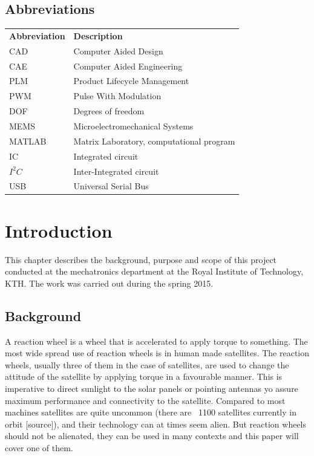 \documentclass[a4paper,11pt]{kth-mag}
\begin{document}
\section*{Abbreviations}
\noindent{}\begin{tabular}{@{}p{2.5cm}l}
\textbf{Abbreviation} 	& \textbf{Description} \vspace{.5em} \\
CAD			& Computer Aided Design \\
CAE			& Computer Aided Engineering\\
PLM			& Product Lifecycle Management\\
PWM			& Pulse With Modulation\\
DOF			& Degrees of freedom\\
MEMS			& Microelectromechanical Systems \\
MATLAB		& Matrix Laboratory, computational program\\
IC			& Integrated circuit\\
$I^2C$		& Inter-Integrated circuit\\
USB			& Universal Serial Bus \\

\end{tabular}
\cleardoublepage

\mainmatter
\pagestyle{newchap}

\chapter{Introduction}
This chapter describes the background, purpose and scope of this project conducted at the mechatronics department at the Royal Institute of Technology, KTH. The work was carried out during the spring 2015.

\section{Background}
A reaction wheel is a wheel that is accelerated to apply torque to something. The most wide spread use of reaction wheels is in human made satellites. The  reaction wheels, usually three of them in the case of satellites, are used to change the attitude of the satellite by applying torque in a favourable manner. This is imperative to direct sunlight to the solar panels or pointing antennas yo assure maximum performance and connectivity to the satellite. Compared to most machines satellites are quite uncommon (there are ~1100 satellites currently in orbit [source]), and their technology can at times seem alien. But reaction wheels should not be alienated, they can be used in many contexts and this paper will cover one of them.  
\end{document}
